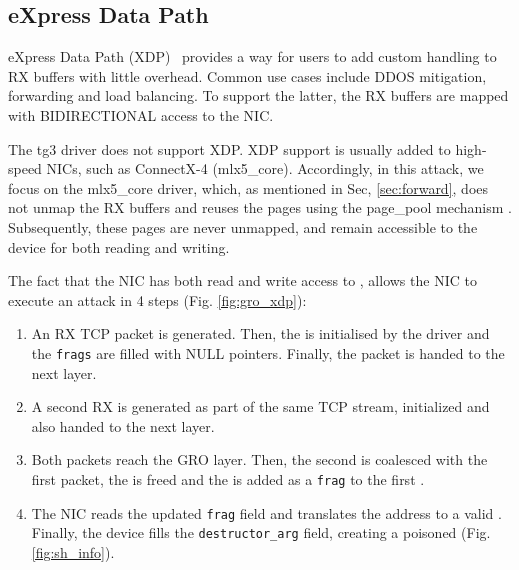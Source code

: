 
\subsection{eXpress Data Path}\label{sec:xdp}

eXpress Data Path (XDP)~\cite{xdp} provides a way for users to add custom handling to RX buffers with little overhead. Common use cases include DDOS mitigation, forwarding and load balancing. To support the latter, the RX buffers are mapped with BIDIRECTIONAL access to the NIC. 

The tg3 driver does not support XDP. XDP support is usually added to high-speed NICs, such as ConnectX-4 (mlx5\_core). Accordingly, in this attack, we focus on the mlx5\_core driver, which, as mentioned in Sec, \ref{sec:forward}, does not unmap the RX buffers and reuses the pages using the page\_pool mechanism \cite{page_pool}. Subsequently, these pages are never unmapped, and remain accessible to the device for both reading and writing. 

The fact that the NIC has both read and write access to \shinfo, allows the NIC to execute an attack in 4 steps (Fig. \ref{fig:gro_xdp}):
\begin{enumerate}
    \item An RX TCP packet is generated. Then, the \shinfo{} is initialised by the driver and the \texttt{frags} are filled with NULL pointers. Finally, the packet is handed to the next layer.
    
    \item A second RX \skb{} is generated as part of the same TCP stream, initialized and also handed to the next layer.
    
    \item Both packets reach the GRO layer. Then, the second \skb{} is coalesced with the first packet, the \skb{} is freed and the \data{} is added as a \texttt{frag} to the first \skb.
    
    \item The NIC reads the updated \texttt{frag} field and translates the \page{} address to a valid \kva{}. Finally, the device fills the \texttt{destructor\_arg} field, creating a poisoned \skb{} (Fig. \ref{fig:sh_info}).
\end{enumerate}

